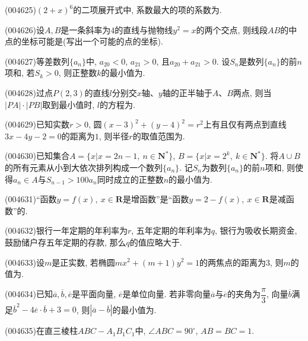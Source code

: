 \item (004625)$(2+x)^6$的二项展开式中, 系数最大的项的系数为.
\item (004626)设$A,B$是一条斜率为$4$的直线与抛物线$y^2=x$的两个交点, 则线段$AB$的中点的坐标可能是(写出一个可能的点的坐标).
\item (004627)等差数列$\{a_n\}$中, $a_{20}<0$, $a_{21}>0$, 且$a_{20}+a_{21}>0$. 设$S_n$是数列$\{a_n\}$的前$n$项和, 若$S_k>0$, 则正整数$k$的最小值为.
\item (004628)过点$P(2,3)$的直线$l$分别交$x$轴、$y$轴的正半轴于$A$、$B$两点, 则当$|PA|\cdot|PB|$取到最小值时, $l$的方程为.
\item (004629)已知实数$r>0$, 圆$(x-3)^2+(y-4)^2=r^2$上有且仅有两点到直线$3x-4y-2=0$的距离为$1$, 则半径$r$的取值范围为.
\item (004630)已知集合$A=\{x|x=2n-1, \ n\in \mathbf{N}^*\}$, $B=\{x|x=2^k, \ k\in \mathbf{N}^*\}$. 将$A\cup B$的所有元素从小到大依次排列构成一个数列$\{a_n\}$. 记$S_n$为数列$\{a_n\}$的前$n$项和, 则使得$a_n\in A$与${S_{n-1}}>100{a_n}$同时成立的正整数$n$的最小值为.
\item (004631)``函数$y=f(x), \ x\in \mathbf{R}$是增函数''是``函数$y=2-f(x), \ x\in \mathbf{R}$是减函数''的.
\item (004632)银行一年定期的年利率为$r$, 五年定期的年利率为$q$, 银行为吸收长期资金, 鼓励储户存五年定期的存款, 那么$q$的值应略大于.
\item (004633)设$m$是正实数, 若椭圆$mx^2+(m+1)y^2=1$的两焦点的距离为$3$, 则$m$的值为.
\item (004634)已知$\overline a,\overline b,\overline e$是平面向量, $\overline e$是单位向量. 若非零向量$\overline a$与$\overline e$的夹角为$\dfrac{\pi}3$, 向量$\overline b$满足$\overline b^2-4\overline e\cdot \overline b+3=0$, 则$|\overline a-\overline b|$的最小值为.
\item (004635)在直三棱柱$ABC-A_1B_1C_1$中, $\angle ABC=90^\circ$, $AB=BC=1$.
\begin{center}
\end{center}

